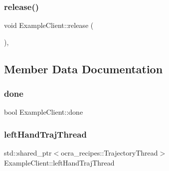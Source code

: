 \hypertarget{classExampleClient_a5acf25784c1c5b51c2c085327f195002}{}\label{classExampleClient_a5acf25784c1c5b51c2c085327f195002} 
\subsubsection{\texorpdfstring{release()}{release()}}
{\footnotesize\ttfamily void Example\+Client\+::release (\begin{DoxyParamCaption}{ }\end{DoxyParamCaption})\hspace{0.3cm}{\ttfamily [protected]}, {\ttfamily [virtual]}}



\subsection{Member Data Documentation}
\hypertarget{classExampleClient_acd2cf0f0479ff8bbf5b64924d83beb60}{}\label{classExampleClient_acd2cf0f0479ff8bbf5b64924d83beb60} 
\subsubsection{\texorpdfstring{done}{done}}
{\footnotesize\ttfamily bool Example\+Client\+::done\hspace{0.3cm}{\ttfamily [private]}}

\hypertarget{classExampleClient_a4311b0e8c4878c23df2b5ba048d8bc05}{}\label{classExampleClient_a4311b0e8c4878c23df2b5ba048d8bc05} 
\subsubsection{\texorpdfstring{left\+Hand\+Traj\+Thread}{leftHandTrajThread}}
{\footnotesize\ttfamily std\+::shared\+\_\+ptr$<$ocra\+\_\+recipes\+::\+Trajectory\+Thread$>$ Example\+Client\+::left\+Hand\+Traj\+Thread\hspace{0.3cm}{\ttfamily [private]}}

\hypertarget{classExampleClient_a7fb2b50cbdac0ec3a32e44b5bbc3b11f}{}\label{classExampleClient_a7fb2b50cbdac0ec3a32e44b5bbc3b11f} 
